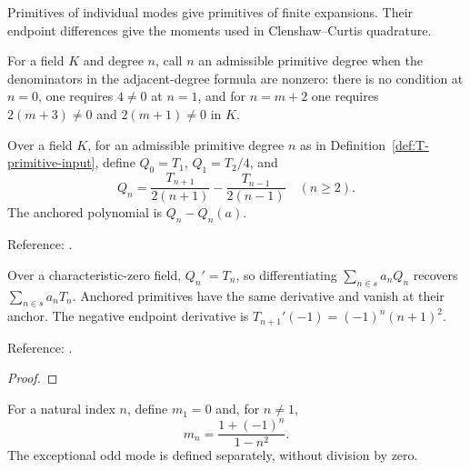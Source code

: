 Primitives of individual modes give primitives of finite expansions. Their endpoint differences give the moments used in Clenshaw--Curtis quadrature.

\begin{definition}
\label{def:T-primitive-input}
\leanok
For a field $K$ and degree $n$, call $n$ an admissible primitive degree when the
denominators in the adjacent-degree formula are nonzero: there is no condition
at $n=0$, one requires $4\ne0$ at $n=1$, and for $n=m+2$ one requires
$2(m+3)\ne0$ and $2(m+1)\ne0$ in $K$.
\end{definition}

\begin{definition}
\label{def:T-primitives}
\leanok
Over a field $K$, for an admissible primitive degree $n$ as in Definition~\ref{def:T-primitive-input}, define $Q_0=T_1$, $Q_1=T_2/4$, and
\[
 Q_n=\frac{T_{n+1}}{2(n+1)}-\frac{T_{n-1}}{2(n-1)}\quad(n\ge2).
\]
The anchored polynomial is $Q_n-Q_n(a)$.

Reference: \cite[Chapter 19]{atap}.
\end{definition}

\begin{theorem}
\label{thm:T-coefficient-calculus}
\leanok
Over a characteristic-zero field, $Q_n'=T_n$, so differentiating $\sum_{n\in s}a_nQ_n$ recovers
$\sum_{n\in s}a_nT_n$. Anchored primitives have the same derivative and vanish
at their anchor. The negative endpoint derivative is
$T_{n+1}'(-1)=(-1)^n(n+1)^2$.

Reference: \cite[Chapters 19 and 21]{atap}.
\end{theorem}
\begin{proof}
\leanok
\end{proof}

\begin{definition}
\label{def:integral-moment}
\leanok
For a natural index $n$, define $m_1=0$ and, for $n\ne1$,
\[
 m_n=\frac{1+(-1)^n}{1-n^2}.
\]
The exceptional odd mode is defined separately, without division by zero.
\end{definition}

